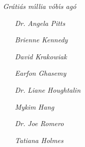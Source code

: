 \thispagestyle{empty}
\vspace*{\fill}
    \textit{Gr\'ati\'as m\'\i llia v\'ob\'\i s ag\'o}
    \begin{itemize}
        \item[\textit{Dr.}] \textit{Angela Pitts}
        \item[] \textit{Brienne Kennedy}
        \item[] \textit{David Krakowiak}
        \item[] \textit{Earfon Ghasemy}
        \item[\textit{Dr.}] \textit{Liane Houghtalin}
        \item[] \textit{Mykim Hang}
        \item[\textit{Dr.}] \textit{Joe Romero}
        \item[] \textit{Tatiana Holmes}
    \end{itemize}
\vspace*{\fill}
\clearpage